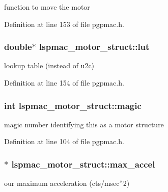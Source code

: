 function to move the motor 



Definition at line 153 of file pgpmac.\-h.

\hypertarget{structlspmac__motor__struct_a7b43671f7f3e06521f6cf91fb9ac707d}{
\subsubsection[{lut}]{\setlength{\rightskip}{0pt plus 5cm}double$\ast$ lspmac\-\_\-motor\-\_\-struct\-::lut}}\label{structlspmac__motor__struct_a7b43671f7f3e06521f6cf91fb9ac707d}


lookup table (instead of u2c) 



Definition at line 154 of file pgpmac.\-h.

\hypertarget{structlspmac__motor__struct_a3342670c97c0b2646409f2ef28f63d1c}{
\subsubsection[{magic}]{\setlength{\rightskip}{0pt plus 5cm}int lspmac\-\_\-motor\-\_\-struct\-::magic}}\label{structlspmac__motor__struct_a3342670c97c0b2646409f2ef28f63d1c}


magic number identifying this as a motor structure 



Definition at line 104 of file pgpmac.\-h.

\hypertarget{structlspmac__motor__struct_a50cf4c0711cea164e332bc34705a1a68}{
\subsubsection[{max\-\_\-accel}]{$\ast$ lspmac\-\_\-motor\-\_\-struct\-::max\-\_\-accel}}\label{structlspmac__motor__struct_a50cf4c0711cea164e332bc34705a1a68}


our maximum acceleration (cts/msec$^\wedge$2) 



